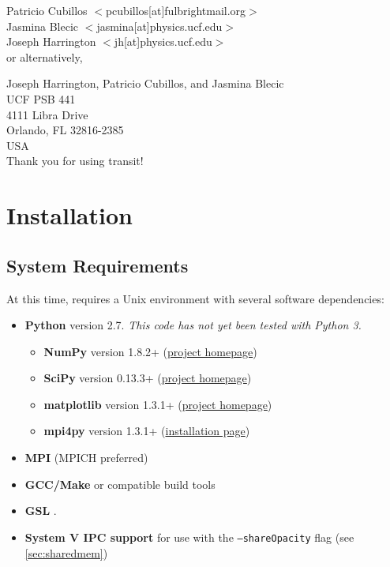 \documentclass[letterpaper, 12pt]{article}
\begin{document}
\noindent Patricio Cubillos $<$pcubillos[at]fulbrightmail.org$>$  \\
\noindent Jasmina Blecic    $<$jasmina[at]physics.ucf.edu$>$      \\
\noindent Joseph Harrington $<$jh[at]physics.ucf.edu$>$           \\

\noindent or alternatively, \newline

\noindent Joseph Harrington, Patricio Cubillos, and Jasmina Blecic \\
UCF PSB 441            \\
4111 Libra Drive       \\
Orlando, FL 32816-2385 \\
USA                    \\

Thank you for using transit! \newline


\section{Installation}
\label{sec:installation}

\subsection{System Requirements}

At this time, {\transit} requires a Unix environment with several software
dependencies:

\begin{itemize} \itemsep0pt
\item \textbf{Python} version 2.7. \emph{This code has not yet been tested with
      Python 3.}
\begin{itemize} \itemsep0pt
  \item \textbf{NumPy} version 1.8.2+
        (\href{http://www.numpy.org/}{project homepage})
  \item \textbf{SciPy} version 0.13.3+
        (\href{http://www.scipy.org/}{project homepage})
  \item \textbf{matplotlib} version 1.3.1+
        (\href{http://matplotlib.org/}{project homepage})
  \item \textbf{mpi4py} version 1.3.1+
        (\href{http://mpi4py.scipy.org/docs/usrman/install.html}{installation page})
\end{itemize}
\item \textbf{MPI} (MPICH preferred)
\item \textbf{GCC/Make} or compatible build tools
\item \textbf{GSL} .
\item \textbf{System V IPC support} for use with the {\tt --shareOpacity}
      flag (see {\ref{sec:sharedmem}})
\end{itemize}
\end{document}
